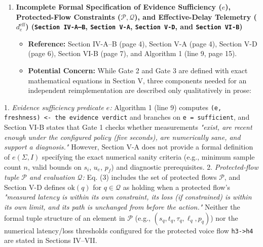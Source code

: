\documentclass[11pt,a4paper]{article}
\begin{document}
\begin{enumerate}[leftmargin=1.6em,itemsep=3pt]
\item \textbf{Incomplete Formal Specification of Evidence Sufficiency ($e$), Protected-Flow Constraints ($\mathcal{P}, \mathcal{Q}$), and Effective-Delay Telemetry ($d_e^{\text{eff}}$) (\texttt{Section IV-A–B}, \texttt{Section V-A}, \texttt{Section V-D}, and \texttt{Section VI-B})}
\begin{itemize}[leftmargin=1.8em,itemsep=2pt]
\item \textbf{Reference:} Section IV-A–B (page 4), Section V-A (page 4), Section V-D (page 6), Section VI-B (page 7), and Algorithm 1 (line 9, page 15).
\item \textbf{Potential Concern:} While Gate 2 and Gate 3 are defined with exact mathematical equations in Section V, three components needed for an independent reimplementation are described only qualitatively in prose:
\end{itemize}
\end{enumerate}
1. \emph{Evidence sufficiency predicate $e$:} Algorithm 1 (line 9) computes \texttt{(e, freshness) <- the evidence verdict} and branches on \texttt{e = sufficient}, and Section VI-B states that Gate 1 checks whether measurements \emph{"exist, are recent enough under the configured policy (five seconds), are numerically sane, and support a diagnosis."} However, Section V-A does not provide a formal definition of $e(\Sigma, I)$ specifying the exact numerical sanity criteria (e.g., minimum sample count $n$, valid bounds on $s_i$, $u_e$, $p_f$) and diagnostic prerequisites.
2. \emph{Protected-flow tuple $\mathcal{P}$ and evaluation $\mathcal{Q}$:} Eq. (3) includes the set of protected flows $\mathcal{P}$, and Section V-D defines $\text{ok}(q)$ for $q \in \mathcal{Q}$ as holding when a protected flow's \emph{"measured latency is within its own constraint, its loss (if constrained) is within its own limit, and its path is unchanged from before the action."} Neither the formal tuple structure of an element in $\mathcal{P}$ (e.g., $(s_q, t_q, \tau_q, \ell_q, p_q)$) nor the numerical latency/loss thresholds configured for the protected voice flow \texttt{h3->h4} are stated in Sections IV–VII.
\end{document}
